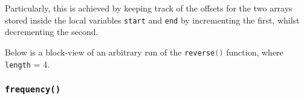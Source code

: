 \documentclass{article}
\newcommand{\code}[1]{\lstinline[language=C]!#1!}
\begin{document}
Particularly, this is achieved by keeping track of the offsets for the two arrays stored inside the
local variables \code{start} and \code{end} by incrementing the first, whilst decrementing the
second.

Below is a block-view of an arbitrary run of the \code{reverse()} function, where \code{length} = 4.



\newpage

\subsubsection{\texttt{frequency()}}


\end{document}
